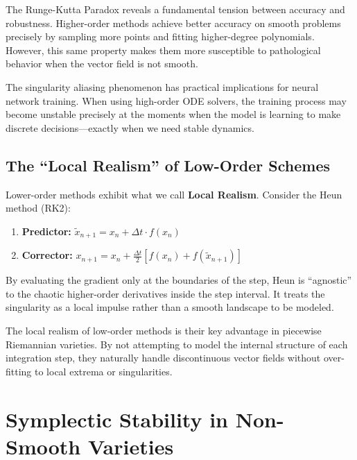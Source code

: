 \documentclass[12pt,a4paper]{article}
\begin{document}
The Runge-Kutta Paradox reveals a fundamental tension between accuracy and robustness. Higher-order methods achieve better accuracy on smooth problems precisely by sampling more points and fitting higher-degree polynomials. However, this same property makes them more susceptible to pathological behavior when the vector field is not smooth.

The singularity aliasing phenomenon has practical implications for neural network training. When using high-order ODE solvers, the training process may become unstable precisely at the moments when the model is learning to make discrete decisions—exactly when we need stable dynamics.

\subsection{The ``Local Realism'' of Low-Order Schemes}

Lower-order methods exhibit what we call \textbf{Local Realism}. Consider the Heun method (RK2):

\begin{enumerate}[label=\textbf{\arabic*.}, leftmargin=1.5cm]
\item \textbf{Predictor:} $\tilde{x}_{n+1} = x_n + \Delta t \cdot f(x_n)$
\item \textbf{Corrector:} $x_{n+1} = x_n + \frac{\Delta t}{2}[f(x_n) + f(\tilde{x}_{n+1})]$
\end{enumerate}

By evaluating the gradient only at the boundaries of the step, Heun is ``agnostic'' to the chaotic higher-order derivatives inside the step interval. It treats the singularity as a local impulse rather than a smooth landscape to be modeled.

The local realism of low-order methods is their key advantage in piecewise Riemannian varieties. By not attempting to model the internal structure of each integration step, they naturally handle discontinuous vector fields without over-fitting to local extrema or singularities.

\section{Symplectic Stability in Non-Smooth Varieties}
\end{document}
